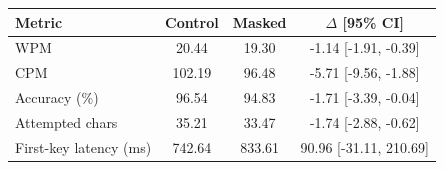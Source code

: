 \begin{tabular}{lccc}
\toprule
Metric & Control & Masked & $\Delta$ [95\% CI] \\
\midrule
WPM & 20.44 & 19.30 & -1.14 [-1.91, -0.39] \\
CPM & 102.19 & 96.48 & -5.71 [-9.56, -1.88] \\
Accuracy (\%) & 96.54 & 94.83 & -1.71 [-3.39, -0.04] \\
Attempted chars & 35.21 & 33.47 & -1.74 [-2.88, -0.62] \\
First-key latency (ms) & 742.64 & 833.61 & 90.96 [-31.11, 210.69] \\
\bottomrule
\end{tabular}
